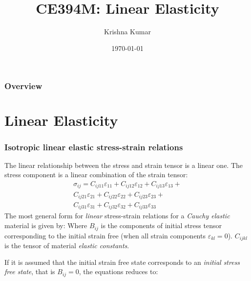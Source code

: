 \documentclass[notes]{beamer}
\title[CE394M: Linear Elasticity]{CE394M: Linear Elasticity}
\author{Krishna Kumar} %
\institute[UT Austin] %
{
University of Texas at Austin \\
\medskip
\textit{
  \url{krishnak@utexas.edu}} %
}
\date{\today} %
\begin{document}
\begin{frame}
\titlepage %
\end{frame}

\begin{frame}
 \frametitle{Overview}
 \tableofcontents
\end{frame}

\section{Linear Elasticity}
\begin{frame}
\frametitle{Isotropic linear elastic stress-strain relations}
The linear relationship between the stress and strain tensor is a linear one. The stress component
is a linear combination of the strain tensor:
\begin{equation*}
	\begin{split}
		\sigma_{ij} = C_{ij11}\varepsilon_{11} + C_{ij12}\varepsilon_{12} + C_{ij13}\varepsilon_{13} + \\
			C_{ij21}\varepsilon_{21} + C_{ij22}\varepsilon_{22} + C_{ij23}\varepsilon_{23} + \\ C_{ij31}\varepsilon_{31} + C_{ij32}\varepsilon_{32} + C_{ij33}\varepsilon_{33}
	\end{split}
\end{equation*} 
The most general form for \textit{linear} stress-strain relations for a \textit{Cauchy elastic}
material is given by:
	Where $B_{ij}$ is the components of initial stress tensor corresponding to the initial strain free (when all strain components $\varepsilon_{kl} = 0$). $C_{ijkl}$ is the tensor of material \textit{elastic constants}.
	
	If it is assumed that the initial strain free state corresponds to an \textit{initial stress free state}, that is $B_{ij} = 0$, the equations reduces to:
\end{frame}
\end{document}
